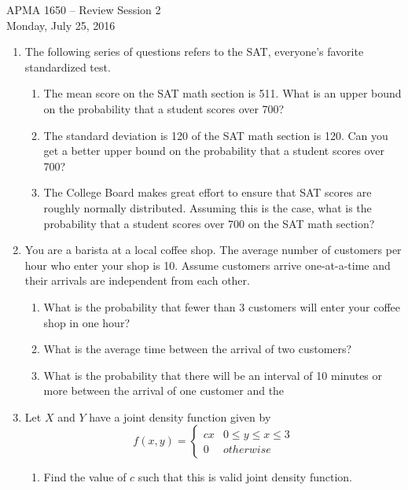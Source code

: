 \documentclass[12pt]{article}
\begin{document}
\title{}
\author{\vspace{-10ex} }

\begin{center}
{\LARGE APMA 1650 -- Review Session 2}\\
\vspace{5mm}
{\large Monday, July 25, 2016}\\
\end{center}

\begin{enumerate}

\item The following series of questions refers to the SAT, everyone's favorite standardized test.
\begin{enumerate}
\item The mean score on the SAT math section is 511. What is an upper bound on the probability that a student scores over 700? 

\item The standard deviation is 120 of the SAT math section is 120. Can you get a better upper bound on the probability that a student scores over 700?

\item The College Board makes great effort to ensure that SAT scores are roughly normally distributed. Assuming this is the case, what is the probability that a student scores over 700 on the SAT math section?
\end{enumerate}

\item You are a barista at a local coffee shop. The average number of customers per hour who enter your shop is 10. Assume customers arrive one-at-a-time and their arrivals are independent from each other.
\begin{enumerate}
\item What is the probability that fewer than 3 customers will enter your coffee shop in one hour?

\item What is the average time between the arrival of two customers?

\item What is the probability that there will be an interval of 10 minutes or more between the arrival of one customer and the 
\end{enumerate}

\item Let $X$ and $Y$ have a joint density function given by
\[
f(x,y) = \begin{cases}
c x & 0 \leq y \leq x \leq 3 \\
0 & otherwise
\end{cases}
\]
\begin{enumerate}
\item Find the value of $c$ such that this is valid joint density function.


\end{enumerate}
\end{enumerate}
\end{document}
